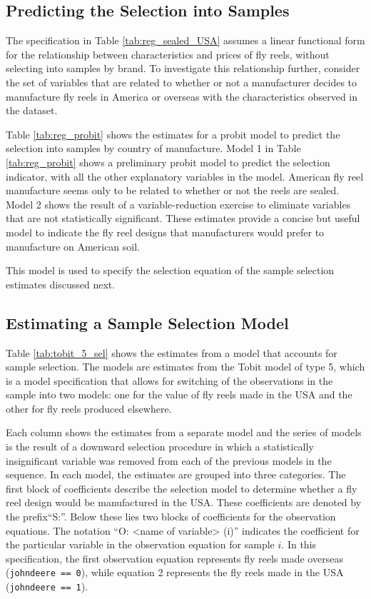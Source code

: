 \documentclass[11pt]{paper}
\begin{document}
\subsection{Predicting the Selection into Samples}


The specification in 
Table \ref{tab:reg_sealed_USA}
assumes a linear functional form for
the relationship between characteristics and prices of fly reels, 
without selecting into samples by brand.
% 
To investigate this relationship further, 
consider the set of variables that are related to
whether or not 
a manufacturer decides to manufacture fly reels in 
America or overseas
with the characteristics observed in the dataset. 



Table \ref{tab:reg_probit} 
shows the estimates for a probit model to predict the selection
into samples by country of manufacture.
% 
Model 1 in Table \ref{tab:reg_probit} 
shows a preliminary probit model to predict the selection indicator,
with all the other explanatory variables in the model.
American fly reel manufacture seems only to be related to 
whether or not the reels are sealed.
% 
Model 2 shows the result of a variable-reduction exercise
to eliminate variables that are not statistically significant.
These estimates provide a concise but useful model to
indicate the fly reel designs that manufacturers would 
prefer to manufacture on American soil.
% 

% 
This model is used to specify the selection equation
of the sample selection estimates discussed next. 


\subsection{Estimating a Sample Selection Model}

Table \ref{tab:tobit_5_sel} shows the estimates from a model that accounts for sample selection. 
The models are estimates from the Tobit model of type 5, 
which is a model specification that allows for switching 
of the observations in the sample into two models:
one for the value of fly reels made in the USA 
and the other for fly reels produced elsewhere.
% 

Each column shows the estimates from a separate model
and the series of models is the result of a downward selection
procedure in which a statistically insignificant variable
was removed from each of the previous models in the sequence. 
% 
In each model, the estimates are grouped into three categories.
% 
The first block of coefficients describe the selection model
to determine whether a fly reel design would be manufactured in the USA.
These coefficients are denoted by the prefix``S:''.
Below these lies two blocks of coefficients for the observation equations. 
The notation ``O: <name of variable> (i)''
indicates the coefficient for the particular variable
in the observation equation for sample $i$. 
In this specification, the first observation equation represents
fly reels made overseas (\texttt{johndeere == 0}), 
while equation 2 represents the fly reels made in the USA
(\texttt{johndeere == 1}).
\end{document}
